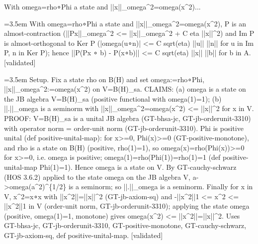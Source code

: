 \documentclass{article}
\newcommand{\step}[1]{\par\noindent\hangindent=3.5em\hangafter=1%
  \makebox[3.5em][l]{\textbf{#1.}}}
\newcommand{\steptag}[1]{\hfill{\small\textsf{[#1]}}}
\begin{document}
\begin{proofbox}{With omega=rho∘Phi a state and ||x||\_omega\textasciicircum{}2=omega(x\textasciicircum{}2)...}
\step{1} With omega=rho∘Phi a state and ||x||\_omega\textasciicircum{}2=omega(x\textasciicircum{}2), P is an almost-contraction (||Px||\_omega\textasciicircum{}2 <= ||x||\_omega\textasciicircum{}2 + C eta ||x||\textasciicircum{}2) and Im P is almost-orthogonal to Ker P (|omega(u∘n)| <= C sqrt(eta) ||u|| ||n|| for u in Im P, n in Ker P); hence ||P(Px ∘ b) - P(x∘b)|| <= C sqrt(eta) ||x|| ||b|| for b in A. \steptag{validated} \\[6pt]
\step{1.1} Setup. Fix a state rho on B(H) and set omega:=rho∘Phi, ||x||\_omega\textasciicircum{}2:=omega(x\textasciicircum{}2) on V=B(H)\_sa. CLAIMS: (a) omega is a state on the JB algebra V=B(H)\_sa (positive functional with omega(1)=1); (b) ||.||\_omega is a seminorm with ||x||\_omega\textasciicircum{}2=omega(x\textasciicircum{}2) <= ||x||\textasciicircum{}2 for x in V. PROOF: V=B(H)\_sa is a unital JB algebra (GT-bhsa-jc, GT-jb-orderunit-3310) with operator norm = order-unit norm (GT-jb-orderunit-3310). Phi is positive unital (def positive-unital-map): for x>=0, Phi(x)>=0 (GT-positive-monotone), and rho is a state on B(H) (positive, rho(1)=1), so omega(x)=rho(Phi(x))>=0 for x>=0, i.e. omega is positive; omega(1)=rho(Phi(1))=rho(1)=1 (def positive-unital-map Phi(1)=1). Hence omega is a state on V. By GT-cauchy-schwarz (HOS 3.6.2) applied to the state omega on the JB algebra V, a->omega(a\textasciicircum{}2)\textasciicircum{}\{1/2\} is a seminorm; so ||.||\_omega is a seminorm. Finally for x in V, x\textasciicircum{}2=x∘x with ||x\textasciicircum{}2||=||x||\textasciicircum{}2 (GT-jb-axiom-sq) and -||x\textasciicircum{}2||1 <= x\textasciicircum{}2 <= ||x\textasciicircum{}2||1 in V (order-unit norm, GT-jb-orderunit-3310); applying the state omega (positive, omega(1)=1, monotone) gives omega(x\textasciicircum{}2) <= ||x\textasciicircum{}2||=||x||\textasciicircum{}2. Uses GT-bhsa-jc, GT-jb-orderunit-3310, GT-positive-monotone, GT-cauchy-schwarz, GT-jb-axiom-sq, def positive-unital-map. \steptag{validated} \\[4pt]

\end{proofbox}
\end{document}
